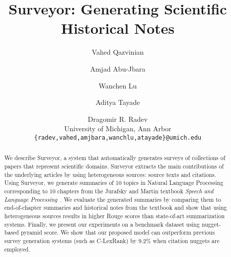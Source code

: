 \documentclass[11pt]{article}
\title{Surveyor: Generating Scientific Historical Notes}
\author{Vahed Qazvinian \and Amjad Abu-Jbara \and  Wanchen Lu \and  Aditya Tayade \and Dragomir R. Radev \\
  University of Michigan, Ann Arbor\\
  {\tt \{radev,vahed,amjbara,wanchlu,atayade\}@umich.edu} \\
}
\date{}
\begin{document}
\maketitle

\begin{abstract}
We describe Surveyor, a system that automatically generates surveys of
collections of papers that represent scientific domains. Surveyor
extracts the main contributions of the underlying articles by
using heterogeneous sources: source texts and citations.  Using
Surveyor, we generate summaries of 10 topics in Natural Language
Processing corresponding to 10 chapters from the Jurafsky and Martin
textbook \emph{Speech and Language Processing}~\cite{JurafskyM08}. We evaluate the generated
summaries by comparing them to end-of-chapter summaries and
historical notes from the textbook and show that using heterogeneous
sources results in higher Rouge scores than state-of-art
summarization systems. Finally, we present our experiments on a benchmark dataset using nugget-based pyramid score. We show that our proposed model can outperform previous survey generation systems (such as C-LexRank) by 9.2\% when citation nuggets are employed.
\end{abstract}











\balance


\end{document}
